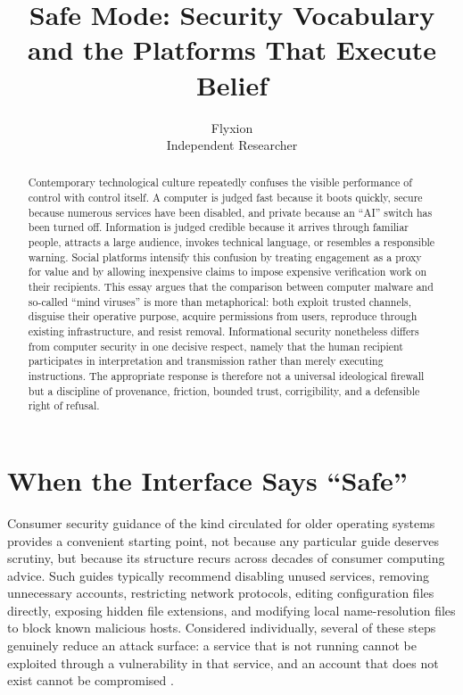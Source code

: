 \documentclass[11pt]{article}
\title{Safe Mode: Security Vocabulary and the Platforms That Execute Belief}
\author{Flyxion \\ \small Independent Researcher}
\date{}
\begin{document}
\maketitle

\begin{abstract}
Contemporary technological culture repeatedly confuses the visible performance of control with control itself. A computer is judged fast because it boots quickly, secure because numerous services have been disabled, and private because an ``AI'' switch has been turned off. Information is judged credible because it arrives through familiar people, attracts a large audience, invokes technical language, or resembles a responsible warning. Social platforms intensify this confusion by treating engagement as a proxy for value and by allowing inexpensive claims to impose expensive verification work on their recipients. This essay argues that the comparison between computer malware and so-called ``mind viruses'' is more than metaphorical: both exploit trusted channels, disguise their operative purpose, acquire permissions from users, reproduce through existing infrastructure, and resist removal. Informational security nonetheless differs from computer security in one decisive respect, namely that the human recipient participates in interpretation and transmission rather than merely executing instructions. The appropriate response is therefore not a universal ideological firewall but a discipline of provenance, friction, bounded trust, corrigibility, and a defensible right of refusal.
\end{abstract}

\section{When the Interface Says ``Safe''}

Consumer security guidance of the kind circulated for older operating systems provides a convenient starting point, not because any particular guide deserves scrutiny, but because its structure recurs across decades of consumer computing advice. Such guides typically recommend disabling unused services, removing unnecessary accounts, restricting network protocols, editing configuration files directly, exposing hidden file extensions, and modifying local name-resolution files to block known malicious hosts. Considered individually, several of these steps genuinely reduce an attack surface: a service that is not running cannot be exploited through a vulnerability in that service, and an account that does not exist cannot be compromised \cite{ross2012risk}.
\end{document}
